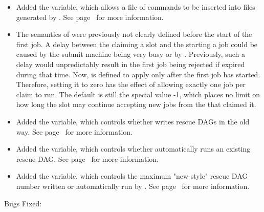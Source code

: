 \begin{itemize}

\item Added the  variable, which allows a file
  of commands to be inserted into  files generated
  by .  See page~\pageref{param:DAGManInsertSubFile}
  for more information.

\item The semantics of  were previously not
clearly defined before the start of the first job.  A delay between
the  claiming a slot and the  starting a
job could be caused by the submit machine being very busy or by
.  Previously, such a delay would
unpredictably result in the first job being rejected if
 expired during that time.  Now,
 is defined to apply only after the first job
has started.  Therefore, setting it to zero has the effect of allowing
exactly one job per claim to run.  The default is still the special
value -1, which places no limit on how long the slot may continue
accepting new jobs from the  that claimed it.

\item Added the  variable, which controls whether
 writes rescue DAGs in the old way.  See
page~\pageref{param:DAGManOldRescue} for more information.

\item Added the  variable, which controls
whether  automatically runs an existing rescue DAG.
See page~\pageref{param:DAGManAutoRescue} for more information.

\item Added the  variable, which
controls the maximum "new-style" rescue DAG number written or
automatically run by .
See page~\pageref{param:DAGManMaxRescueNum} for more information.

\end{itemize}

\noindent Bugs Fixed:

